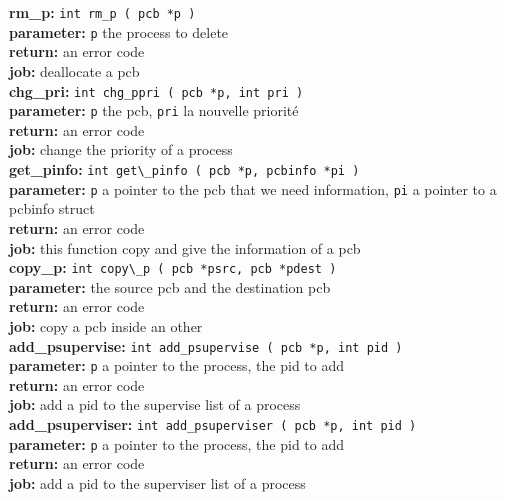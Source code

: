 \noindent\textbf{rm\_p:} \verb+int rm_p ( pcb *p )+\\
\textbf{parameter:} \verb+p+ the process to delete \\
\textbf{return:} an error code\\
\textbf{job:} deallocate a pcb\\

\noindent\textbf{chg\_pri:} \verb+int chg_ppri ( pcb *p, int pri )+\\
\textbf{parameter:} \verb+p+ the pcb, \verb+pri+ la nouvelle priorité\\
\textbf{return:} an error code\\
\textbf{job:} change the priority of a process\\

\noindent\textbf{get\_pinfo:} \verb+int get\_pinfo ( pcb *p, pcbinfo *pi )+\\
\textbf{parameter:} \verb+p+ a pointer to the pcb that we need information, \verb+pi+ a pointer to a pcbinfo struct\\
\textbf{return:} an error code\\
\textbf{job:} this function copy and give the information of a pcb\\

\noindent\textbf{copy\_p:} \verb+int copy\_p ( pcb *psrc, pcb *pdest )+\\
\textbf{parameter:} the source pcb and the destination pcb\\
\textbf{return:} an error code\\
\textbf{job:} copy a pcb inside an other\\

\noindent\textbf{add\_psupervise:} \verb+int add_psupervise ( pcb *p, int pid )+\\
\textbf{parameter:} \verb+p+ a pointer to the process, the pid to add\\
\textbf{return:} an error code\\
\textbf{job:} add a pid to the supervise list of a process\\

\noindent\textbf{add\_psuperviser:} \verb+int add_psuperviser ( pcb *p, int pid )+\\
\textbf{parameter:} \verb+p+ a pointer to the process, the pid to add\\
\textbf{return:} an error code\\
\textbf{job:} add a pid to the superviser list of a process\\


